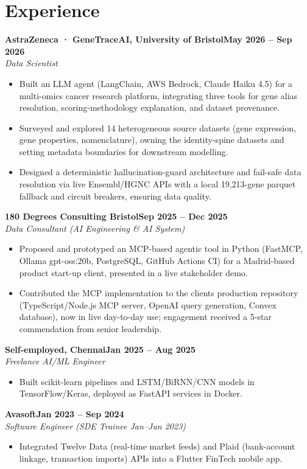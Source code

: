 \documentclass[a4paper,10pt]{article}
\newcommand{\entry}[4]{\noindent\textbf{#1}\hfill\textbf{#2}\\ \textit{#3}\hfill\textit{#4}\par}
\begin{document}
\section{Experience}
\entry{AstraZeneca · GeneTraceAI, University of Bristol}{May 2026 – Sep 2026}{Data Scientist}{}
\begin{itemize}
  \item Built an LLM agent (LangChain, AWS Bedrock, Claude Haiku 4.5) for a multi-omics cancer research platform, integrating three tools for gene alias resolution, scoring-methodology explanation, and dataset provenance.
  \item Surveyed and explored 14 heterogeneous source datasets (gene expression, gene properties, nomenclature), owning the identity-spine datasets and setting metadata boundaries for downstream modelling.
  \item Designed a deterministic hallucination-guard architecture and fail-safe data resolution via live Ensembl/HGNC APIs with a local 19,213-gene parquet fallback and circuit breakers, ensuring data quality.
\end{itemize}
\vspace{3pt}
\entry{180 Degrees Consulting Bristol}{Sep 2025 – Dec 2025}{Data Consultant (AI Engineering \& AI System)}{}
\begin{itemize}
  \item Proposed and prototyped an MCP-based agentic tool in Python (FastMCP, Ollama gpt-oss:20b, PostgreSQL, GitHub Actions CI) for a Madrid-based product start-up client, presented in a live stakeholder demo.
  \item Contributed the MCP implementation to the client\textquotesingle{}s production repository (TypeScript/Node.js MCP server, OpenAI query generation, Convex database), now in live day-to-day use; engagement received a 5-star commendation from senior leadership.
\end{itemize}
\vspace{3pt}
\entry{Self-employed, Chennai}{Jan 2025 – Aug 2025}{Freelance AI/ML Engineer}{}
\begin{itemize}
  \item Built scikit-learn pipelines and LSTM/BiRNN/CNN models in TensorFlow/Keras, deployed as FastAPI services in Docker.
\end{itemize}
\vspace{3pt}
\entry{Avasoft}{Jan 2023 – Sep 2024}{Software Engineer (SDE Trainee Jan–Jun 2023)}{}
\begin{itemize}
  \item Integrated Twelve Data (real-time market feeds) and Plaid (bank-account linkage, transaction imports) APIs into a Flutter FinTech mobile app.
\end{itemize}
\end{document}
